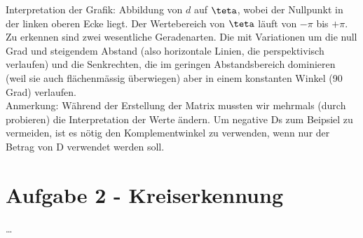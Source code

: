 Interpretation der Grafik: Abbildung von $d$ auf $\teta$, wobei der Nullpunkt in der linken oberen
Ecke liegt. Der Wertebereich von $\teta$ l\"auft von $-\pi$ bis $+\pi$. Zu erkennen sind zwei 
wesentliche Geradenarten. Die mit Variationen um die null Grad und steigendem Abstand (also 
horizontale Linien, die perspektivisch verlaufen) und die Senkrechten, die im geringen Abstandsbereich
dominieren (weil sie auch fl\"achenm\"assig \"uberwiegen) aber in einem konstanten Winkel (90 Grad)
verlaufen.
\\
Anmerkung: W\"ahrend der Erstellung der Matrix mussten wir mehrmals (durch probieren) die
Interpretation der Werte \"andern. Um negative Ds zum Beipsiel zu vermeiden, ist es n\"otig
den Komplementwinkel zu verwenden, wenn nur der Betrag von D verwendet werden soll.

\section*{Aufgabe 2 - Kreiserkennung}
\ldots




